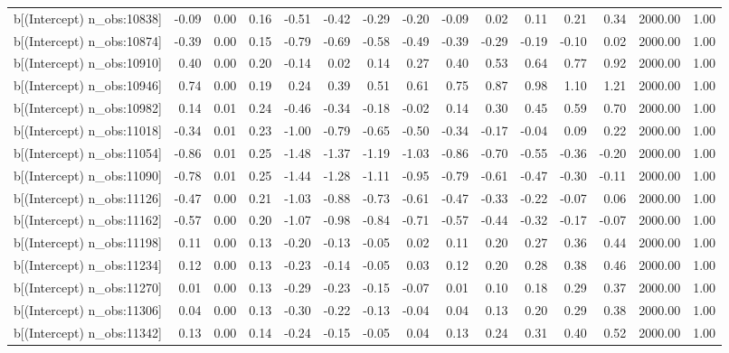 \begin{table}[ht]
\begin{tabular}{rrrrrrrrrrrrrrr}
  b[(Intercept) n\_obs:10838] & -0.09 & 0.00 & 0.16 & -0.51 & -0.42 & -0.29 & -0.20 & -0.09 & 0.02 & 0.11 & 0.21 & 0.34 & 2000.00 & 1.00 \\ 
  b[(Intercept) n\_obs:10874] & -0.39 & 0.00 & 0.15 & -0.79 & -0.69 & -0.58 & -0.49 & -0.39 & -0.29 & -0.19 & -0.10 & 0.02 & 2000.00 & 1.00 \\ 
  b[(Intercept) n\_obs:10910] & 0.40 & 0.00 & 0.20 & -0.14 & 0.02 & 0.14 & 0.27 & 0.40 & 0.53 & 0.64 & 0.77 & 0.92 & 2000.00 & 1.00 \\ 
  b[(Intercept) n\_obs:10946] & 0.74 & 0.00 & 0.19 & 0.24 & 0.39 & 0.51 & 0.61 & 0.75 & 0.87 & 0.98 & 1.10 & 1.21 & 2000.00 & 1.00 \\ 
  b[(Intercept) n\_obs:10982] & 0.14 & 0.01 & 0.24 & -0.46 & -0.34 & -0.18 & -0.02 & 0.14 & 0.30 & 0.45 & 0.59 & 0.70 & 2000.00 & 1.00 \\ 
  b[(Intercept) n\_obs:11018] & -0.34 & 0.01 & 0.23 & -1.00 & -0.79 & -0.65 & -0.50 & -0.34 & -0.17 & -0.04 & 0.09 & 0.22 & 2000.00 & 1.00 \\ 
  b[(Intercept) n\_obs:11054] & -0.86 & 0.01 & 0.25 & -1.48 & -1.37 & -1.19 & -1.03 & -0.86 & -0.70 & -0.55 & -0.36 & -0.20 & 2000.00 & 1.00 \\ 
  b[(Intercept) n\_obs:11090] & -0.78 & 0.01 & 0.25 & -1.44 & -1.28 & -1.11 & -0.95 & -0.79 & -0.61 & -0.47 & -0.30 & -0.11 & 2000.00 & 1.00 \\ 
  b[(Intercept) n\_obs:11126] & -0.47 & 0.00 & 0.21 & -1.03 & -0.88 & -0.73 & -0.61 & -0.47 & -0.33 & -0.22 & -0.07 & 0.06 & 2000.00 & 1.00 \\ 
  b[(Intercept) n\_obs:11162] & -0.57 & 0.00 & 0.20 & -1.07 & -0.98 & -0.84 & -0.71 & -0.57 & -0.44 & -0.32 & -0.17 & -0.07 & 2000.00 & 1.00 \\ 
  b[(Intercept) n\_obs:11198] & 0.11 & 0.00 & 0.13 & -0.20 & -0.13 & -0.05 & 0.02 & 0.11 & 0.20 & 0.27 & 0.36 & 0.44 & 2000.00 & 1.00 \\ 
  b[(Intercept) n\_obs:11234] & 0.12 & 0.00 & 0.13 & -0.23 & -0.14 & -0.05 & 0.03 & 0.12 & 0.20 & 0.28 & 0.38 & 0.46 & 2000.00 & 1.00 \\ 
  b[(Intercept) n\_obs:11270] & 0.01 & 0.00 & 0.13 & -0.29 & -0.23 & -0.15 & -0.07 & 0.01 & 0.10 & 0.18 & 0.29 & 0.37 & 2000.00 & 1.00 \\ 
  b[(Intercept) n\_obs:11306] & 0.04 & 0.00 & 0.13 & -0.30 & -0.22 & -0.13 & -0.04 & 0.04 & 0.13 & 0.20 & 0.29 & 0.38 & 2000.00 & 1.00 \\ 
  b[(Intercept) n\_obs:11342] & 0.13 & 0.00 & 0.14 & -0.24 & -0.15 & -0.05 & 0.04 & 0.13 & 0.24 & 0.31 & 0.40 & 0.52 & 2000.00 & 1.00 \\ 

\end{tabular}
\end{table}
